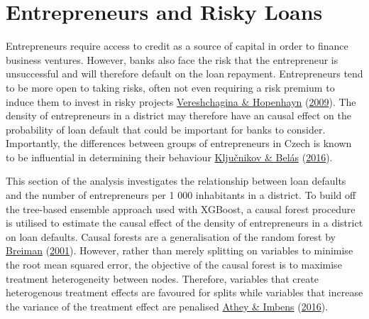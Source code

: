 \documentclass[11pt,preprint, authoryear]{elsarticle}
\numberwithin{equation}{section}
\numberwithin{figure}{section}
\numberwithin{table}{section}
\begin{document}
\hypertarget{entrepreneurs-and-risky-loans}{%
\section{Entrepreneurs and Risky
Loans}\label{entrepreneurs-and-risky-loans}}

Entrepreneurs require access to credit as a source of capital in order
to finance business ventures. However, banks also face the risk that the
entrepreneur is unsuccessful and will therefore default on the loan
repayment. Entrepreneurs tend to be more open to taking risks, often not
even requiring a risk premium to induce them to invest in risky projects
\protect\hyperlink{ref-Risk}{Vereshchagina \& Hopenhayn}
(\protect\hyperlink{ref-Risk}{2009}). The density of entrepreneurs in a
district may therefore have an causal effect on the probability of loan
default that could be important for banks to consider. Importantly, the
differences between groups of entrepreneurs in Czech is known to be
influential in determining their behaviour
\protect\hyperlink{ref-Entrep}{Ključnikov \& Belás}
(\protect\hyperlink{ref-Entrep}{2016}).

This section of the analysis investigates the relationship between loan
defaults and the number of entrepreneurs per 1 000 inhabitants in a
district. To build off the tree-based ensemble approach used with
XGBoost, a causal forest procedure is utilised to estimate the causal
effect of the density of entrepreneurs in a district on loan defaults.
Causal forests are a generalisation of the random forest by
\protect\hyperlink{ref-Breiman2001}{Breiman}
(\protect\hyperlink{ref-Breiman2001}{2001}). However, rather than merely
splitting on variables to minimise the root mean squared error, the
objective of the causal forest is to maximise treatment heterogeneity
between nodes. Therefore, variables that create heterogenous treatment
effects are favoured for splits while variables that increase the
variance of the treatment effect are penalised
\protect\hyperlink{ref-AtheyImbensRecursive}{Athey \& Imbens}
(\protect\hyperlink{ref-AtheyImbensRecursive}{2016}).
\end{document}
